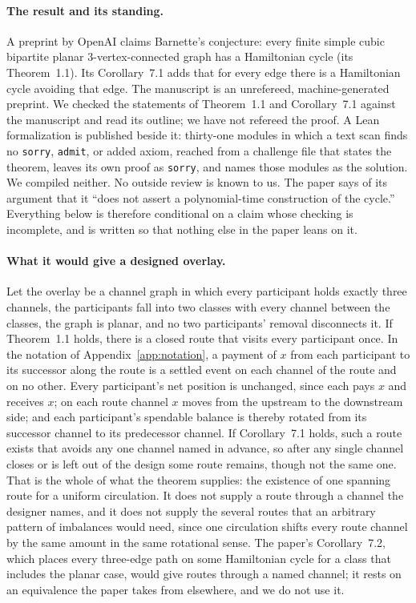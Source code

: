 \documentclass[11pt]{article}
\theoremstyle{plain}
\theoremstyle{definition}
\theoremstyle{remark}
\begin{document}
\paragraph{The result and its standing.} A preprint by OpenAI \citep{openai2026barnette} claims Barnette's conjecture: every finite simple cubic bipartite planar 3-vertex-connected graph has a Hamiltonian cycle (its Theorem~1.1). Its Corollary~7.1 adds that for every edge there is a Hamiltonian cycle avoiding that edge. The manuscript is an unrefereed, machine-generated preprint. We checked the statements of Theorem~1.1 and Corollary~7.1 against the manuscript and read its outline; we have not refereed the proof. A Lean formalization is published beside it: thirty-one modules in which a text scan finds no \texttt{sorry}, \texttt{admit}, or added axiom, reached from a challenge file that states the theorem, leaves its own proof as \texttt{sorry}, and names those modules as the solution. We compiled neither. No outside review is known to us. The paper says of its argument that it ``does not assert a polynomial-time construction of the cycle.'' Everything below is therefore conditional on a claim whose checking is incomplete, and is written so that nothing else in the paper leans on it.

\paragraph{What it would give a designed overlay.} Let the overlay be a channel graph in which every participant holds exactly three channels, the participants fall into two classes with every channel between the classes, the graph is planar, and no two participants' removal disconnects it. If Theorem~1.1 holds, there is a closed route that visits every participant once. In the notation of Appendix~\ref{app:notation}, a payment of $x$ from each participant to its successor along the route is a settled event on each channel of the route and on no other. Every participant's net position is unchanged, since each pays $x$ and receives $x$; on each route channel $x$ moves from the upstream to the downstream side; and each participant's spendable balance is thereby rotated from its successor channel to its predecessor channel. If Corollary~7.1 holds, such a route exists that avoids any one channel named in advance, so after any single channel closes or is left out of the design some route remains, though not the same one. That is the whole of what the theorem supplies: the existence of one spanning route for a uniform circulation. It does not supply a route through a channel the designer names, and it does not supply the several routes that an arbitrary pattern of imbalances would need, since one circulation shifts every route channel by the same amount in the same rotational sense. The paper's Corollary~7.2, which places every three-edge path on some Hamiltonian cycle for a class that includes the planar case, would give routes through a named channel; it rests on an equivalence the paper takes from elsewhere, and we do not use it.
\end{document}
